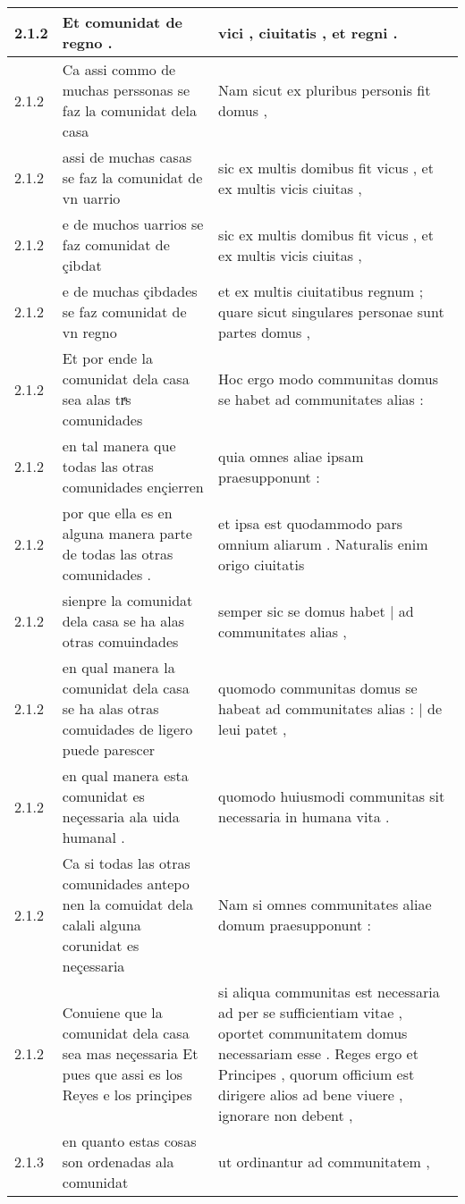\begin{tabular}{|p{1cm}|p{6.5cm}|p{6.5cm}|}
2.1.2 & Et comunidat de regno . & vici , ciuitatis , et regni . \\\hline
2.1.2 & Ca assi commo de muchas perssonas se faz la comunidat dela casa & Nam sicut ex pluribus personis fit domus , \\\hline
2.1.2 & assi de muchas casas se faz la comunidat de vn uarrio & sic ex multis domibus fit vicus , et ex multis vicis ciuitas , \\\hline
2.1.2 & e de muchos uarrios se faz comunidat de çibdat & sic ex multis domibus fit vicus , et ex multis vicis ciuitas , \\\hline
2.1.2 & e de muchas çibdades se faz comunidat de vn regno & et ex multis ciuitatibus regnum ; quare sicut singulares personae sunt partes domus , \\\hline
2.1.2 & Et por ende la comunidat dela casa sea alas trͣs comunidades & Hoc ergo modo communitas domus se habet ad communitates alias : \\\hline
2.1.2 & en tal manera que todas las otras comunidades ençierren & quia omnes aliae ipsam praesupponunt : \\\hline
2.1.2 & por que ella es en alguna manera parte de todas las otras comunidades . & et ipsa est quodammodo pars omnium aliarum . Naturalis enim origo ciuitatis \\\hline
2.1.2 & sienpre la comunidat dela casa se ha alas otras comuindades & semper sic se domus habet | ad communitates alias , \\\hline
2.1.2 & en qual manera la comunidat dela casa se ha alas otras comuidades de ligero puede parescer & quomodo communitas domus se habeat ad communitates alias : | de leui patet , \\\hline
2.1.2 & en qual manera esta comunidat es neçessaria ala uida humanal . & quomodo huiusmodi communitas sit necessaria in humana vita . \\\hline
2.1.2 & Ca si todas las otras comunidades antepo nen la comuidat dela calali alguna corunidat es neçessaria & Nam si omnes communitates aliae domum praesupponunt : \\\hline
2.1.2 & Conuiene que la comunidat dela casa sea mas neçessaria Et pues que assi es los Reyes e los prinçipes & si aliqua communitas est necessaria ad per se sufficientiam vitae , oportet communitatem domus necessariam esse . Reges ergo et Principes , quorum officium est dirigere alios ad bene viuere , ignorare non debent , \\\hline
2.1.3 & en quanto estas cosas son ordenadas ala comunidat & ut ordinantur ad communitatem , \\\hline

\end{tabular}
